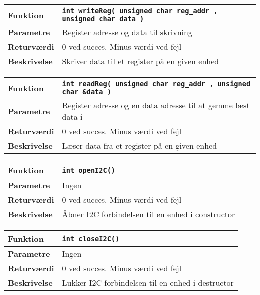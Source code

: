 \begin{center}
    \begin{tabular}{ | l | p{} |}
    \hline
    \textbf{Funktion}	& \verb+int writeReg( unsigned char reg_addr , unsigned char data ) +		\\ \hline
    \textbf{Parametre} 	& Register adresse og data til skrivning									\\ \hline
    \textbf{Returværdi}	& 0 ved succes. Minus værdi ved fejl										\\ \hline
    \textbf{Beskrivelse}	& Skriver data til et register på en given enhed							\\ \hline
    \end{tabular}
\end{center}

\begin{center}
    \begin{tabular}{ | l | p{} |}
    \hline
    \textbf{Funktion}	& \verb+int readReg( unsigned char reg_addr , unsigned char &data ) +		\\ \hline
    \textbf{Parametre} 	& Register adresse og en data adresse til at gemme læst data i			\\ \hline
    \textbf{Returværdi}	& 0 ved succes. Minus værdi ved fejl										\\ \hline
    \textbf{Beskrivelse}	& Læser data fra et register på en given enhed							\\ \hline
    \end{tabular}
\end{center}

\begin{center}
    \begin{tabular}{ | l | p{} |}
    \hline
    \textbf{Funktion}	& \verb+int openI2C() +													\\ \hline
    \textbf{Parametre} 	& Ingen																	\\ \hline
    \textbf{Returværdi}	& 0 ved succes. Minus værdi ved fejl										\\ \hline
    \textbf{Beskrivelse}	& Åbner I2C forbindelsen til en enhed i constructor						\\ \hline
    \end{tabular}
\end{center}

\begin{center}
    \begin{tabular}{ | l | p{} |}
    \hline
    \textbf{Funktion}	& \verb+int closeI2C() +													\\ \hline
    \textbf{Parametre} 	& Ingen																	\\ \hline
    \textbf{Returværdi}	& 0 ved succes. Minus værdi ved fejl										\\ \hline
    \textbf{Beskrivelse}	& Lukker I2C forbindelsen til en enhed i destructor						\\ \hline
    \end{tabular}
\end{center}

